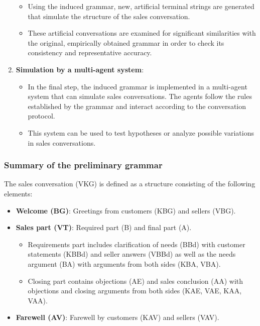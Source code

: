 \documentclass[
]{article}
\begin{document}
\begin{enumerate}
  \begin{itemize}
  \item
    Using the induced grammar, new, artificial terminal strings are
    generated that simulate the structure of the sales conversation.
  \item
    These artificial conversations are examined for significant
    similarities with the original, empirically obtained grammar in
    order to check its consistency and representative accuracy.
  \end{itemize}
\item
  \textbf{Simulation by a multi-agent system}:

  \begin{itemize}
  \item
    In the final step, the induced grammar is implemented in a
    multi-agent system that can simulate sales conversations. The agents
    follow the rules established by the grammar and interact according
    to the conversation protocol.
  \item
    This system can be used to test hypotheses or analyze possible
    variations in sales conversations.
  \end{itemize}
\end{enumerate}

\subsubsection{\texorpdfstring{\textbf{Summary of the preliminary
grammar}}{Summary of the preliminary grammar}}\label{summary-of-the-preliminary-grammar}

The sales conversation (VKG) is defined as a structure consisting of the
following elements:

\begin{itemize}
\item
  \textbf{Welcome (BG)}: Greetings from customers (KBG) and sellers
  (VBG).
\item
  \textbf{Sales part (VT)}: Required part (B) and final part (A).

  \begin{itemize}
  \item
    Requirements part includes clarification of needs (BBd) with
    customer statements (KBBd) and seller answers (VBBd) as well as the
    needs argument (BA) with arguments from both sides (KBA, VBA).
  \item
    Closing part contains objections (AE) and sales conclusion (AA) with
    objections and closing arguments from both sides (KAE, VAE, KAA,
    VAA).
  \end{itemize}
\item
  \textbf{Farewell (AV)}: Farewell by customers (KAV) and sellers (VAV).
\end{itemize}
\end{document}

